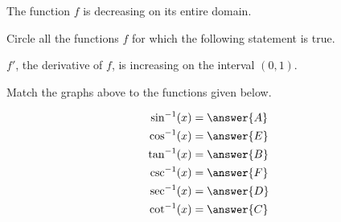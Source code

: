 \documentclass{ximera}
\begin{document}
\begin{exercise}
\begin{exercise}
The function $f$ is decreasing on its entire domain.

\begin{selectAll}
\end{selectAll}
\end{exercise}
\begin{exercise}
Circle all the functions $f$ for which the following statement is true.

$f'$, the derivative of $f$, is increasing on the interval $(0,1)$.

\begin{selectAll}
\end{selectAll}
\end{exercise}
\begin{exercise}

Match the  graphs above  to the functions given below.

\begin{align*}
\sin^{-1}(x) &= \answer{A}\\
\cos^{-1}(x) &= \answer{E}\\
\tan^{-1}(x) &= \answer{B}\\
\csc^{-1}(x) &= \answer{F}\\
\sec^{-1}(x) &= \answer{D}\\
\cot^{-1}(x) &= \answer{C}
\end{align*}

\end{exercise}
\end{exercise}
\end{document}
